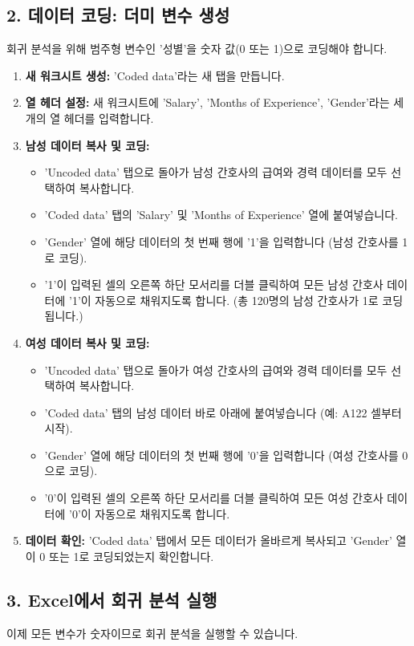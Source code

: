 \documentclass[11pt,a4paper]{book}
\theoremstyle{definition}
\begin{document}
\subsection{2. 데이터 코딩: 더미 변수 생성}
회귀 분석을 위해 범주형 변수인 '성별'을 숫자 값(0 또는 1)으로 코딩해야 합니다.

\begin{enumerate}
    \item \textbf{새 워크시트 생성:} 'Coded data'라는 새 탭을 만듭니다.
    \item \textbf{열 헤더 설정:} 새 워크시트에 'Salary', 'Months of Experience', 'Gender'라는 세 개의 열 헤더를 입력합니다.
    \item \textbf{남성 데이터 복사 및 코딩:}
    \begin{itemize}
        \item 'Uncoded data' 탭으로 돌아가 남성 간호사의 급여와 경력 데이터를 모두 선택하여 복사합니다.
        \item 'Coded data' 탭의 'Salary' 및 'Months of Experience' 열에 붙여넣습니다.
        \item 'Gender' 열에 해당 데이터의 첫 번째 행에 '1'을 입력합니다 (남성 간호사를 1로 코딩).
        \item '1'이 입력된 셀의 오른쪽 하단 모서리를 더블 클릭하여 모든 남성 간호사 데이터에 '1'이 자동으로 채워지도록 합니다. (총 120명의 남성 간호사가 1로 코딩됩니다.)
    \end{itemize}
    \item \textbf{여성 데이터 복사 및 코딩:}
    \begin{itemize}
        \item 'Uncoded data' 탭으로 돌아가 여성 간호사의 급여와 경력 데이터를 모두 선택하여 복사합니다.
        \item 'Coded data' 탭의 남성 데이터 바로 아래에 붙여넣습니다 (예: A122 셀부터 시작).
        \item 'Gender' 열에 해당 데이터의 첫 번째 행에 '0'을 입력합니다 (여성 간호사를 0으로 코딩).
        \item '0'이 입력된 셀의 오른쪽 하단 모서리를 더블 클릭하여 모든 여성 간호사 데이터에 '0'이 자동으로 채워지도록 합니다.
    \end{itemize}
    \item \textbf{데이터 확인:} 'Coded data' 탭에서 모든 데이터가 올바르게 복사되고 'Gender' 열이 0 또는 1로 코딩되었는지 확인합니다.
\end{enumerate}

\subsection{3. Excel에서 회귀 분석 실행}
이제 모든 변수가 숫자이므로 회귀 분석을 실행할 수 있습니다.
\end{document}

